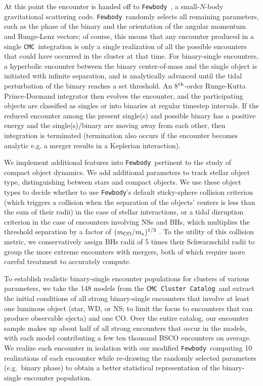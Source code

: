 \documentclass[twocolumn]{aastex631}
\newcommand{\CMC}{\texttt{CMC}}
\newcommand{\CMCcat}{\texttt{CMC Cluster Catalog}}
\newcommand{\fewbody}{\texttt{Fewbody}}
\begin{document}
At this point the encounter is handed off to \fewbody\ \citep{2004MNRAS.352....1F}, a small-$N$-body gravitational scattering code.
\fewbody\ randomly selects all remaining parameters, such as the phase of the binary and the orientation of the angular momentum and Runge-Lenz vectors; of course, this means that any encounter produced in a single \CMC\ integration is only a single realization of all the possible encounters that could have occurred in the cluster at that time.
For binary-single encounters, a hyperbolic encounter between the binary center-of-mass and the single object is initiated with infinite separation, and is analytically advanced until the tidal perturbation of the binary reaches a set threshold.
An 8$^{\rm th}$-order Runge-Kutta Prince-Dormand integrator then evolves the encounter, and the participating objects are classified as singles or into binaries at regular timestep intervals.
If the reduced encounter among the present single(s) and possible binary has a positive energy and the single(s)/binary are moving away from each other, then integration is terminated (termination also occurs if the encounter becomes analytic e.g. a merger results in a Keplerian interaction).

We implement additional features into \fewbody\ pertinent to the study of compact object dynamics.
We add additional parameters to track stellar object type, distinguishing between stars and compact objects.
We use these object types to decide whether to use \fewbody's default sticky-sphere collision criterion (which triggers a collision when the separation of the objects' centers is less than the sum of their radii) in the case of stellar interactions, or a tidal disruption criterion in the case of encounters involving NSs and BHs, which multiplies the threshold separation by a factor of $(m_{\rm CO} / m_{*})^{1/3}$ \citep[as was done in][]{Kremer2019}.
To the utility of this collision metric, we conservatively assign BHs radii of 5 times their Schwarzschild radii to group the more extreme encounters with mergers, both of which require more careful treatment to accurately compute.

To establish realistic binary-single encounter populations for clusters of various parameters, we take the 148 models from the \CMCcat\ and extract the initial conditions of all strong binary-single encounters that involve at least one luminous object (star, WD, or NS; to limit the focus to encounters that can produce observable ejecta) and one CO.
Over the entire catalog, our encounter sample makes up about half of all strong encounters that occur in the models, with each model contributing a few ten thousand BSCO encounters on average.
We realize each encounter in isolation with our modified \fewbody\, computing 10 realizations of each encounter while re-drawing the randomly selected parameters (e.g.~binary phase) to obtain a better statistical representation of the binary-single encounter population.
\end{document}
